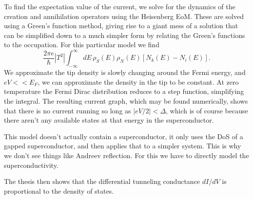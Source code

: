 To  find the expectation value of the current, we solve for the dynamics of the creation and annihilation operators using the Heisenberg EoM. These are solved using a Green's function method, giving rise to a giant mess of a solution that can be simplified down to a much simpler form by relating the Green's functions to the occupation. For this particular model we find
\begin{equation}
    \frac{2\pi e}{\hbar}|T^2|\int_{-\infty}^{\infty}dE \, \rho_S(E) \rho_N(E)[N_k(E)-N_i(E)].
\end{equation}
We approximate the tip density is slowly changing around the Fermi energy, and $eV<<E_F$, we can approximate the density in the tip to be constant. At zero temperature the Fermi Dirac distribution reduces to a step function, simplifying the integral. The resulting current graph, which may be found numerically, shows that there is no current running so long as $|eV/2| < \Delta$, which is of course because there aren't any available states at that energy in the superconductor. 

This model doesn't actually contain a superconductor, it only uses the DoS of a gapped superconductor, and then applies that to a simpler system. This is why we don't see things like Andreev reflection. For this we have to directly model the superconductivity.

The thesis then shows that the differential tunneling conductance $dI/dV$ is proportional to the density of states. 

